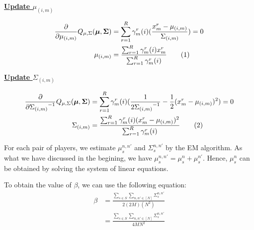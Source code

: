 \documentclass[12pt]{article}
\newcommand\numberthis{\addtocounter{equation}{1}\tag{\theequation}}
\newenvironment{problem}[2][Problem]{\begin{trivlist}
\item[\hskip \labelsep {\bfseries #1}\hskip \labelsep {\bfseries #2.}]}{\end{trivlist}}
\begin{document}
\begin{problem}{2.6.18}
\begin{flushleft}
    \textbf{\underline{Update $\mu_{(i,m)}$}}
\end{flushleft}

\begin{align*}
    \frac{\partial}{\partial \mu_{(i,m)}}Q_{\mu, \Sigma}(\bm{\mu}, \bm{\Sigma}) 
    &= \sum_{r=1}^{R} \gamma^{r}_{m}(i)(\frac{x^r_m - \mu_{(i,m)}}{\Sigma_{(i,m)}}) = 0 \\
    \mu_{(i,m)}
    &= \frac{\sum_{r=1}^{R}\gamma^{r}_{m}(i)x^r_m}{\sum_{r=1}^{R}\gamma^{r}_{m}(i)}
            \numberthis \label{eq:Q26-updateMu}
\end{align*}

\begin{flushleft}
    \textbf{\underline{Update $\Sigma_{(i,m)}$}}
\end{flushleft}

\begin{align*}
    \frac{\partial}{\partial {\Sigma_{(i,m)}}^{-1}}Q_{\mu, \Sigma}(\bm{\mu}, \bm{\Sigma}) 
    &= \sum_{r=1}^{R} \gamma^{r}_{m}(i)(\frac{1}{2{\Sigma_{(i,m)}}^{-1}} - \frac{1}{2}(x^r_m - \mu_{(i,m)})^2) = 0 \\
    \Sigma_{(i,m)}
    &= \frac{\sum_{r=1}^{R}\gamma^{r}_{m}(i)(x^r_m - \mu_{(i,m)})^2}
            {\sum_{r=1}^{R}\gamma^{r}_{m}(i)}  \numberthis \label{eq:Q26-updateSigma}
\end{align*}

For each pair of players, we estimate $\mu_s^{n,n'}$ and $\Sigma_s^{n,n'}$ by the
EM algorithm.
As what we have discussed in the begining, we have $\mu_s^{n,n'} = \mu_s^{n} + \mu_s^{n'}$.
Hence, $\mu_s^{n}$ can be obtained by solving the system of linear equations.

To obtain the value of $\beta$, we can use the following equation:
\begin{align*}
    \beta &= \frac{\sum_{s \in S}\sum_{n, n' \in [N]}\Sigma_s^{n,n'}}{2(2M)(N^2)} \\
    &= \frac{\sum_{s \in S}\sum_{n, n' \in [N]}\Sigma_s^{n,n'}}{4 M N^2} \\
\end{align*}
\end{problem}
\end{document}
